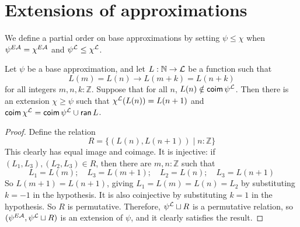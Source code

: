 \section{Extensions of approximations}
\begin{definition}
  \label{def:BaseApprox.LE}
  \leanok
  We define a partial order on base approximations by setting \( \psi \leq \chi \) when \( \psi^{E{\mathcal A}} = \chi^{E{\mathcal A}} \) and \( \psi^{\mathcal L} \leq \chi^{\mathcal L} \).
\end{definition}
\begin{proposition}
  \label{prop:BaseApprox.addOrbit}
  \leanok
  Let \( \psi \) be a base approximation, and let \( L : \mathbb N \to {\mathcal L} \) be a function such that
  \[ L(m) = L(n) \to L(m+k) = L(n+k) \]
  for all integers \( m, n, k : \mathbb Z \).
  Suppose that for all \( n \), \( L(n) \notin \operatorname{\mathsf{coim}} \psi^{\mathcal L} \).
  Then there is an extension \( \chi \geq \psi \) such that \( \chi^{\mathcal L}(L(n)) = L(n+1) \) and \( \operatorname{\mathsf{coim}} \chi^{\mathcal L} = \operatorname{\mathsf{coim}} \psi^{\mathcal L} \cup \operatorname{\mathsf{ran}} L \).
\end{proposition}
\begin{proof}
  \leanok
  Define the relation
  \[ R = \{ (L(n), L(n+1)) \mid n : \mathbb Z \} \]
  This clearly has equal image and coimage.
  It is injective: if \( (L_1, L_3), (L_2, L_3) \in R \), then there are \( m, n : \mathbb Z \) such that
  \[ L_1 = L(m);\quad L_3 = L(m + 1);\quad L_2 = L(n);\quad L_3 = L(n + 1) \]
  So \( L(m + 1) = L(n + 1) \), giving \( L_1 = L(m) = L(n) = L_2 \) by substituting \( k = -1 \) in the hypothesis.
  It is also coinjective by substituting \( k = 1 \) in the hypothesis.
  So \( R \) is permutative.
  Therefore, \( \psi^{\mathcal L} \sqcup R \) is a permutative relation, so \( (\psi^{E{\mathcal A}}, \psi^{\mathcal L} \sqcup R) \) is an extension of \( \psi \), and it clearly satisfies the result.
\end{proof}

